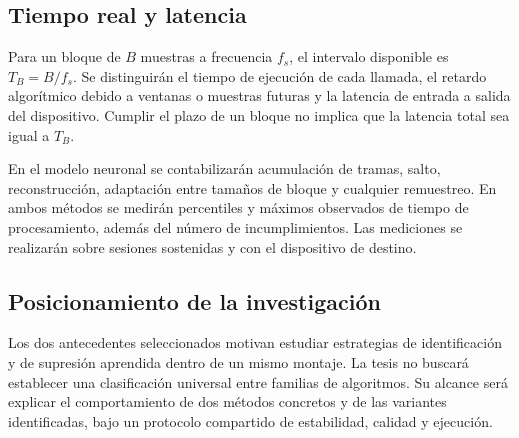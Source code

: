 \subsection{Tiempo real y latencia}
Para un bloque de $B$ muestras a frecuencia $f_s$, el intervalo disponible es $T_B=B/f_s$. Se distinguirán el tiempo de ejecución de cada llamada, el retardo algorítmico debido a ventanas o muestras futuras y la latencia de entrada a salida del dispositivo. Cumplir el plazo de un bloque no implica que la latencia total sea igual a $T_B$.

En el modelo neuronal se contabilizarán acumulación de tramas, salto, reconstrucción, adaptación entre tamaños de bloque y cualquier remuestreo. En ambos métodos se medirán percentiles y máximos observados de tiempo de procesamiento, además del número de incumplimientos. Las mediciones se realizarán sobre sesiones sostenidas y con el dispositivo de destino.

\subsection{Posicionamiento de la investigación}
Los dos antecedentes seleccionados motivan estudiar estrategias de identificación y de supresión aprendida dentro de un mismo montaje. La tesis no buscará establecer una clasificación universal entre familias de algoritmos. Su alcance será explicar el comportamiento de dos métodos concretos y de las variantes identificadas, bajo un protocolo compartido de estabilidad, calidad y ejecución.
